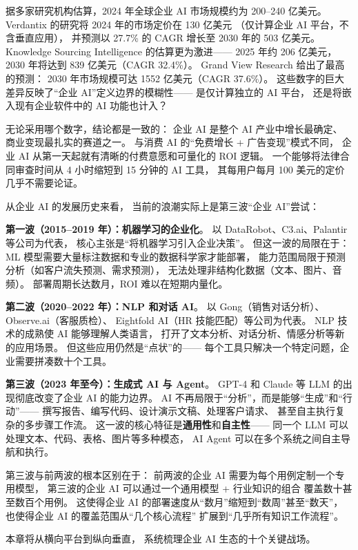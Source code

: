 据多家研究机构估算，2024 年全球企业 AI 市场规模约为 200--240 亿美元。
Verdantix 的研究将 2024 年的市场定价在 130 亿美元
（仅计算企业 AI 平台，不含垂直应用），
并预测以 27.7\% 的 CAGR 增长至 2030 年的 503 亿美元。
Knowledge Sourcing Intelligence 的估算更为激进——
2025 年约 206 亿美元，2030 年将达到 839 亿美元（CAGR 32.4\%）。
Grand View Research 给出了最高的预测：
2030 年市场规模可达 1552 亿美元（CAGR 37.6\%）。
这些数字的巨大差异反映了``企业 AI''定义边界的模糊性——
是仅计算独立的 AI 平台，
还是将嵌入现有企业软件中的 AI 功能也计入？

无论采用哪个数字，结论都是一致的：
企业 AI 是整个 AI 产业中增长最确定、
商业变现最扎实的赛道之一。
与消费 AI 的``免费增长 + 广告变现''模式不同，
企业 AI 从第一天起就有清晰的付费意愿和可量化的 ROI 逻辑。
一个能够将法律合同审查时间从 4 小时缩短到 15 分钟的 AI 工具，
其每用户每月 100 美元的定价几乎不需要论证。

从企业 AI 的发展历史来看，
当前的浪潮实际上是第三波``企业 AI''尝试：

\textbf{第一波（2015--2019 年）：机器学习的企业化}。
以 DataRobot、C3.ai、Palantir 等公司为代表，
核心主张是``将机器学习引入企业决策''。
但这一波的局限在于：
ML 模型需要大量标注数据和专业的数据科学家才能部署，
能力范围局限于预测分析（如客户流失预测、需求预测），
无法处理非结构化数据（文本、图片、音频）。
部署周期长达数月，ROI 难以在短期内量化。

\textbf{第二波（2020--2022 年）：NLP 和对话 AI}。
以 Gong（销售对话分析）、Observe.ai（客服质检）、
Eightfold AI（HR 技能匹配）等公司为代表。
NLP 技术的成熟使 AI 能够理解人类语言，
打开了文本分析、对话分析、情感分析等新的应用场景。
但这些应用仍然是``点状''的——
每个工具只解决一个特定问题，企业需要拼凑数十个工具。

\textbf{第三波（2023 年至今）：生成式 AI 与 Agent}。
GPT-4 和 Claude 等 LLM 的出现彻底改变了企业 AI 的能力边界。
AI 不再局限于``分析''，而是能够``生成''和``行动''——
撰写报告、编写代码、设计演示文稿、处理客户请求、
甚至自主执行复杂的多步骤工作流。
这一波的核心特征是\textbf{通用性}和\textbf{自主性}——
同一个 LLM 可以处理文本、代码、表格、图片等多种模态，
AI Agent 可以在多个系统之间自主导航和执行。

第三波与前两波的根本区别在于：
前两波的企业 AI 需要为每个用例定制一个专用模型，
第三波的企业 AI 可以通过一个通用模型 + 行业知识的组合
覆盖数十甚至数百个用例。
这使得企业 AI 的部署速度从``数月''缩短到``数周''甚至``数天''，
也使得企业 AI 的覆盖范围从``几个核心流程''
扩展到``几乎所有知识工作流程''。

本章将从横向平台到纵向垂直，
系统梳理企业 AI 生态的十个关键战场。

